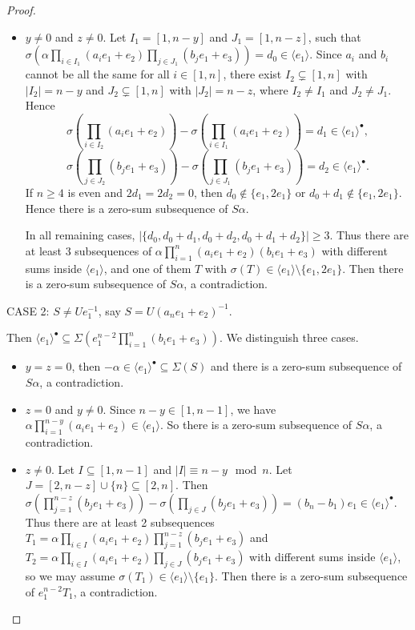 \documentclass[a4paper, 10pt]{amsart}
\theoremstyle{plain}
\theoremstyle{definition}
\numberwithin{equation}{section}
\begin{document}
{\begin{proof}
\begin{itemize}
		\item[(iii)] $y\ne 0$ and $z\ne 0$. Let $I_1= [1,n-y]$  and $J_1=[1,n-z]$, such that $\sigma(\alpha \prod_{i\in I_1} (a_ie_1+e_2) \prod_{j\in J_1} (b_je_1+e_3) ) = d_0\in \langle e_1 \rangle$. 
		Since $a_i$ and $b_i$ cannot be all the same for all $i\in [1,n]$, there exist $I_2\subsetneq [1,n]$ with $|I_2|=n-y$ and $J_2\subsetneq [1,n]$ with $|J_2|=n-z$, where $I_2\ne I_1$ and $J_2\ne J_1$. Hence
		$$\sigma( \prod_{i\in I_2} (a_ie_1+e_2)) -\sigma( \prod_{i\in I_1} (a_ie_1+e_2))= d_1\in \langle e_1 \rangle^{\bullet},$$
		$$\sigma( \prod_{j\in J_2} (b_je_1+e_3)) -\sigma( \prod_{j\in J_1} (b_je_1+e_3))= d_2\in \langle e_1 \rangle^{\bullet}.$$
		If $n\ge 4$ is even and $2d_1=2d_2=0$, then $d_0\notin \{ e_1,2e_1\}$ or $d_0+d_1 \notin \{ e_1,2e_1\}$. Hence there is a zero-sum subsequence of $S\alpha$. 
		
		In all remaining cases, $|\{d_0,d_0+d_1,d_0+d_2,d_0+d_1+d_2\}|\ge 3$.
		Thus there are at least 3 subsequences of $\alpha \prod_{i=1}^n (a_ie_1+e_2)(b_ie_1+e_3) $ with different sums inside $\langle e_1 \rangle$, and one of them $T$ with $\sigma(T)\in \langle e_1 \rangle\setminus \{ e_1,2e_1\}$. Then there is a zero-sum subsequence of $S\alpha$, a contradiction.
		
	\end{itemize}
	
	
	\smallskip
	\noindent
	CASE 2: $S\ne Ue_1^{-1}$,  say $S= U(a_ne_1+e_2)^{-1}$. 

Then $\langle e_1 \rangle^{\bullet} \subseteq \Sigma(e_1^{n-2}\prod_{i=1}^n (b_ie_1+e_3))$. We distinguish three cases.
	\begin{itemize}
		\item[(i)] $y=z=0$, then $-\alpha \in \langle e_1 \rangle^{\bullet} \subseteq \Sigma (S)$ and there is a zero-sum subsequence of $S\alpha$,  a contradiction.
		
		\item[(ii)] $z=0$ and $y\ne 0$. 
		Since $n-y\in[1,n-1]$, we have $\alpha \prod_{i=1}^{n-y} (a_ie_1+e_2)\in \langle e_1 \rangle$.
		So there is a zero-sum subsequence of $S\alpha$, a contradiction.
		
		\item[(iii)]$z\ne 0$. Let $I\subseteq [1,n-1]$ and $|I|\equiv n-y \mod{n}$. Let $J=[2,n-z] \cup \{ n\} \subseteq [2,n]$.  Then $\sigma( \prod_{j= 1}^{n-z} (b_je_1+e_3)) -\sigma( \prod_{j\in J} (b_je_1+e_3))=(b_n -b_1)e_1 \in \langle e_1 \rangle^{\bullet}.$ 
		Thus there are at least 2 subsequences
		$T_1= \alpha \prod_{i\in I} (a_ie_1+e_2) \prod_{j= 1}^{n-z} (b_je_1+e_3)$ and $T_2= \alpha \prod_{i\in I} (a_ie_1+e_2) \prod_{j\in J} (b_je_1+e_3)$ with different sums inside $\langle e_1 \rangle$, so we may assume $\sigma(T_1) \in \langle e_1 \rangle \setminus \{e_1 \}$. Then there is a zero-sum subsequence of $e_1^{n-2}T_1$, a contradiction.
\end{itemize}
	

\end{proof}}
\end{document}
